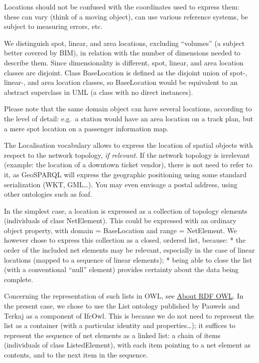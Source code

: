 \documentclass[
  11pt,
]{article}
\begin{document}
Locations should not be confused with the coordinates used to express
them: these can vary (think of a moving object), can use various
reference systems, be subject to measuring errors, etc.

We distinguish spot, linear, and area locations, excluding ``volumes''
(a subject better covered by BIM), in relation with the number of
dimensions needed to describe them. Since dimensionality is different,
spot, linear, and area location classes are disjoint. Class BaseLocation
is defined as the disjoint union of spot-, linear-, and area location
classes, so BaseLocation would be equivalent to an abstract superclass
in UML (a class with no direct instances).

Please note that the same domain object can have several locations,
according to the level of detail: e.g.~a station would have an area
location on a track plan, but a mere spot location on a passenger
information map.

The Localisation vocabulary allows to express the location of spatial
objects with respect to the network topology, \emph{if relevant}. If the
network topology is irrelevant (example: the location of a downtown
ticket vendor), there is not need to refer to it, as GeoSPARQL will
express the geographic positioning using some standard serialization
(WKT, GML\ldots). You may even envisage a postal address, using other
ontologies such as foaf.

In the simplest case, a location is expressed as a collection of
topology elements (individuals of class NetElement). This could be
expressed with an ordinary object property, with domain = BaseLocation
and range = NetElement. We however chose to express this collection as a
closed, ordered list, because: * the order of the included net elements
may be relevant, especially in the case of linear locations (mapped to a
sequence of linear elements); * being able to close the list (with a
conventional ``null'' element) provides certainty about the data being
complete.

Concerning the representation of such lists in OWL, see
\href{https://github.com/UICrail/SemanticRSM/wiki/About-RDF-OWL}{About
RDF OWL}. In the present case, we chose to use the List ontology
published by Pauwels and Terkaj as a component of IfcOwl. This is
because we do not need to represent the list as a container (with a
particular identity and properties\ldots); it suffices to represent the
sequence of net elements as a linked list: a chain of items (individuals
of class ListedElement), with each item pointing to a net element as
contents, and to the next item in the sequence.
\end{document}
